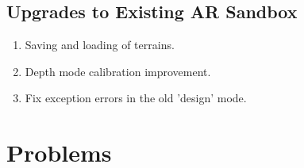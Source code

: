 \documentclass[letterpaper, 10pt, onecolumn, draftclsnofoot]{IEEEtran}
\begin{document}
    \subsection{Upgrades to Existing AR Sandbox}
        \begin{enumerate}
            \item Saving and loading of terrains.
            \item Depth mode calibration improvement.
            \item Fix exception errors in the old 'design' mode.
        \end{enumerate}
        
\section{Problems}
\end{document}
